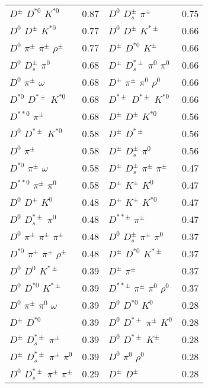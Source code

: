\documentclass[6pt]{article}
\begin{document}
\begin{tabular}{lr|lr}
$D^{\pm}$ $D^{*0}$ $K^{*0}$ & 0.87 & $D^0$ $D_s^{\pm}$ $\pi^{\pm}$ & 0.75 \\
$D^0$ $D^{\pm}$ $K^{*0}$ & 0.77 & $D^0$ $D^{\pm}$ $K^{*\pm}$ & 0.66 \\
$D^0$ $\pi^{\pm}$ $\pi^{\pm}$ $\rho^{\pm}$ & 0.77 & $D^{\pm}$ $D^{*0}$ $K^{\pm}$ & 0.66 \\
$D^0$ $D_s^{\pm}$ $\pi^0$ & 0.68 & $D^{\pm}$ $D_s^{*\pm}$ $\pi^0$ $\pi^0$ & 0.66 \\
$D^0$ $\pi^{\pm}$ $\omega$ & 0.68 & $D^{\pm}$ $\pi^{\pm}$ $\pi^0$ $\rho^0$ & 0.66 \\
$D^{*0}$ $D^{*\pm}$ $K^{*0}$ & 0.68 & $D^{*\pm}$ $D^{*\pm}$ $K^{*0}$ & 0.66 \\
$D^{**0}$ $\pi^{\pm}$ & 0.68 & $D^{\pm}$ $D^{\pm}$ $K^{*0}$ & 0.56 \\
$D^0$ $D^{*\pm}$ $K^{*0}$ & 0.58 & $D^{\pm}$ $D^{*\pm}$ & 0.56 \\
$D^0$ $\pi^{\pm}$ & 0.58 & $D^{\pm}$ $D_s^{\pm}$ $\pi^0$ & 0.56 \\
$D^{*0}$ $\pi^{\pm}$ $\omega$ & 0.58 & $D^{\pm}$ $D_s^{\pm}$ $\pi^{\pm}$ $\pi^{\pm}$ & 0.47 \\
$D^{**0}$ $\pi^{\pm}$ $\pi^0$ & 0.58 & $D^{\pm}$ $K^{\pm}$ $K^0$ & 0.47 \\
$D^0$ $D^{\pm}$ $K^0$ & 0.48 & $D^{\pm}$ $K^{\pm}$ $K^{*0}$ & 0.47 \\
$D^0$ $D_s^{*\pm}$ $\pi^0$ & 0.48 & $D^{**\pm}$ $\pi^{\pm}$ & 0.47 \\
$D^0$ $\pi^{\pm}$ $\pi^{\pm}$ $\pi^{\pm}$ & 0.48 & $D^0$ $D_s^{\pm}$ $\pi^{\pm}$ $\pi^0$ & 0.37 \\
$D^{*0}$ $\pi^{\pm}$ $\pi^{\pm}$ $\rho^{\pm}$ & 0.48 & $D^{\pm}$ $D^{*0}$ $K^{*\pm}$ & 0.37 \\
$D^0$ $D^0$ $K^{*\pm}$ & 0.39 & $D^{\pm}$ $\pi^{\pm}$ & 0.37 \\
$D^0$ $D^{*0}$ $K^{*\pm}$ & 0.39 & $D^{**\pm}$ $\pi^{\pm}$ $\pi^0$ $\rho^0$ & 0.37 \\
$D^0$ $\pi^{\pm}$ $\pi^0$ $\omega$ & 0.39 & $D^0$ $D^{*0}$ $K^0$ & 0.28 \\
$D^{\pm}$ $D^{*0}$ & 0.39 & $D^0$ $D^{*\pm}$ $\pi^{\pm}$ $K^0$ & 0.28 \\
$D^{\pm}$ $D_s^{*\pm}$ $\pi^{\pm}$ & 0.39 & $D^0$ $D^{*\pm}$ $K^{\pm}$ & 0.28 \\
$D^{\pm}$ $D_s^{*\pm}$ $\pi^{\pm}$ $\pi^0$ & 0.39 & $D^0$ $\pi^0$ $\rho^0$ & 0.28 \\
$D^0$ $D_s^{*\pm}$ $\pi^{\pm}$ $\pi^{\pm}$ & 0.29 & $D^{\pm}$ $D^{\pm}$ & 0.28 \\

\end{tabular}
\end{document}
